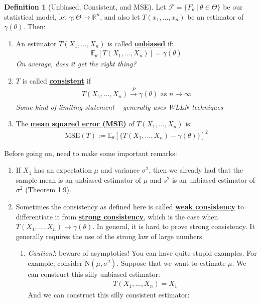 \documentclass[11pt]{scrartcl}
\newcommand{\R}[0]{\mathbb{R}}
\theoremstyle{definition}
\newtheorem{definition}{Definition}
\theoremstyle{remark}
\newcommand{\dfn}[1]{\textbf{\underline{#1}}}
\newcommand{\dist}[0]{\mathcal{F}}
\newcommand{\stat}[0]{T(X_1, ..., X_n )}
\newcommand{\EXth}[1]{\mathbb{E}_\theta \left[ #1 \right]}
\begin{document}
{\begin{definition}[Unbiased, Consistent, and MSE] Let $\dist = \{ F_\theta\ |\ \theta \in \Theta \}$ be our statistical model, let $\gamma: \Theta \rightarrow \R^n$, and also let $T(x_1, ..., x_n)$ be an estimator of $\gamma (\theta)$. Then: 
\begin{enumerate}[noitemsep]
	\item An estimator $T(X_1, ..., X_n)$ is called \dfn{unbiased} if: 
	\begin{align}
		\EXth{\stat} = \gamma(\theta)
	\end{align}
	\emph{On average, does it get the right thing?} 
	\item $T$ is called \dfn{consistent} if 
	\begin{align}
		\stat \xrightarrow[]{P} \gamma(\theta) \text{ as } n \rightarrow \infty 
	\end{align}
	\emph{Some kind of limiting statement -- generally uses WLLN techniques} 
	\item The \dfn{mean squared error (MSE)} of $\stat$ is: 
	\begin{align}
		\text{MSE}(T):= \EXth{\{ \stat - \gamma(\theta) \}}^2
	\end{align}
\end{enumerate}
\end{definition}
Before going on, need to make some important remarks: 
\begin{enumerate}[noitemsep]
	\item If $X_1$ has an expectation $\mu$ and variance $\sigma^2$, then we already had that the sample mean is an unbiased estimator of $\mu$ and $s^2$ is an unbiased estimator of $\sigma^2$ (Theorem 1.9). 
	\item Sometimes the consistency as defined here is called \dfn{weak consistency} to differentiate it from \dfn{strong consistency}, which is the case when $\stat \rightarrow \gamma(\theta)$. In general, it is hard to prove strong consistency. It generally requires the use of the strong law of large numbers. 
	\begin{enumerate}[noitemsep]
		\item \emph{Caution!}: beware of asymptotics! You can have quite stupid examples. For example, consider N$(\mu, \sigma^2)$. Suppose that we want to estimate $\mu$. We can construct this silly unbiased estimator: 
		\begin{align*}	
			& T(X_1, ..., X_n) = X_1 
		\end{align*}
		And we can construct this silly consistent estimator: 

\end{enumerate}
\end{enumerate}}
\end{document}
